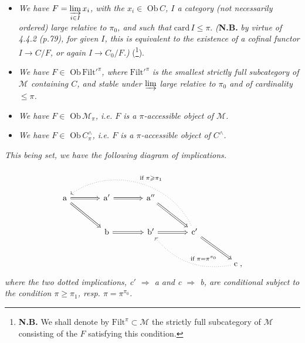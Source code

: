 \documentclass[11pt]{article}
\newcommand{\printedpage}[1]{\marginpar{\footnotesize p.~#1}}
\newcommand{\msp}[1]{\marginpar{\footnotesize [#1]}}
\newcommand{\Mc}{\mathcal{M}}
\begin{document}
\printedpage{53}
\msp{page 162}

\begin{itemize}[leftmargin=4em]
\item[\textit{b)}] \textit{We have $F = \varinjlim\limits_{i \in I} x_i$, with the $x_i \in$} $\mathrm{Ob}\, C$\textit{, $I$ a category (not necessarily ordered) large relative to $\pi_0$, and such that} $\mathrm{card}\, I \leqslant \pi$. \textit{(}\textbf{N.B.} \textit{by virtue of 4.4.2 (p.79), for given $I$, this is equivalent to the existence of a cofinal functor $I \longrightarrow C/F$, or again $I \longrightarrow C_0/F$.)} (\footnote[66]{\textbf{N.B.} We shall denote by $\mathrm{Filt}^{\pi} \subset \Mc$ the strictly full subcategory of $\Mc$ consisting of the $F$ satisfying this condition.}).
\item[\textit{b$'$)}] \textit{We have $F \in$} $\mathrm{Ob}\,\mathrm{Filt}'^{\pi}$\textit{, where} $\mathrm{Filt}'^{\pi}$ \textit{is the smallest strictly full subcategory of $\Mc$ containing $C$, and stable under $\varinjlim$ large relative to $\pi_0$ and of cardinality $\leqslant \pi$.}
\item[\textit{c)}] \textit{We have $F \in$} $\mathrm{Ob}\,\Mc_{\pi}$\textit{, i.e. $F$ is a $\pi$-accessible object of $\Mc$.}
\item[\textit{c$'$)}] \textit{We have $F \in$} $\mathrm{Ob}\, C^{\wedge}_{\pi}$\textit{, i.e. $F$ is a $\pi$-accessible object of $C^{\wedge}$.}
\end{itemize}
\textit{This being set, we have the following diagram of implications.}
\[
\begin{tikzcd}[column sep=large, row sep=large]
\mathrm{a} \arrow[r, Rightarrow] \arrow[dr, Rightarrow] & \mathrm{a}' \arrow[r, Rightarrow] & \mathrm{a}'' \arrow[dr, Rightarrow] & & \\
& \mathrm{b} \arrow[r, Rightarrow] & \mathrm{b}' \arrow[r, Rightarrow] & \mathrm{c}' \arrow[dr, Rightarrow] \arrow[ulll, dotted, bend right=50, "\text{if } \pi \geqslant \pi_1"'] & \\
& & & & \mathrm{c}\;, \arrow[ull, dotted, bend left=30, "\text{if } \pi = \pi^{\pi_0}"']
\end{tikzcd}
\]
\textit{where the two dotted implications, c$'$ $\Longrightarrow$ a and c $\Longrightarrow$ b, are conditional subject to the condition $\pi \geqslant \pi_1$, resp. $\pi = \pi^{\pi_0}$.}

\msp{page 163}
\end{document}
